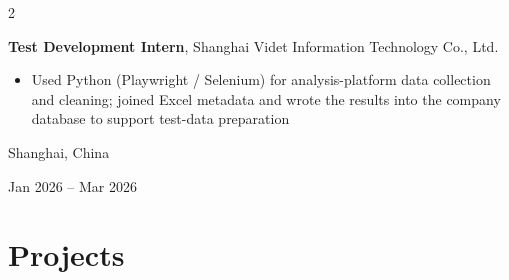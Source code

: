 \documentclass[10pt, a4paper]{article}
\newenvironment{highlights}{
    \begin{itemize}[
        topsep=0.10cm, parsep=0.10cm,
        partopsep=0pt, itemsep=0pt,
        leftmargin=0.4cm + 10pt
    ]
}{
    \end{itemize}
}
\newenvironment{twocolentry}[2][]{
    \onecolentry
    \def\secondColumn{#2}
    \setcolumnwidth{\fill, 4.5cm}
    \begin{paracol}{2}
}{
    \switchcolumn \raggedleft \secondColumn
    \end{paracol}
    \endonecolentry
}
\newcommand{\cvtitle}[1]{%
    {\fontsize{10.5pt}{12pt}\selectfont #1\par}%
    \vspace{0.02cm}%
}
\begin{document}
    \vspace{0.14cm}

    \begin{twocolentry}{
        Shanghai, China

    Jan 2026 – Mar 2026
    }
        \cvtitle{\textbf{Test Development Intern}, Shanghai Videt Information Technology Co., Ltd.}
        \begin{highlights}
            \item Used Python (Playwright / Selenium) for analysis-platform data collection and cleaning; joined Excel metadata and wrote the results into the company database to support test-data preparation
        \end{highlights}
    \end{twocolentry}

\vspace{-0.2cm}
\section{Projects}
\end{document}
